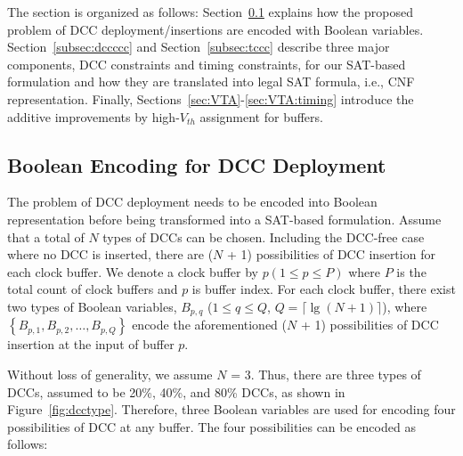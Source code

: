 The section is organized as follows: Section~\ref{subsec:eddcd} explains how the proposed problem of DCC deployment/insertions are encoded with Boolean variables. Section~\ref{subsec:dccccc} and Section~\ref{subsec:tccc} describe three major components, DCC constraints and timing constraints, for our SAT-based formulation and how they are translated into legal SAT formula, i.e., CNF representation. Finally, Sections~\ref{sec:VTA}-\ref{sec:VTA:timing} introduce the additive improvements by high-$V_{th}$ assignment for buffers.


\subsection{Boolean Encoding for DCC Deployment}
\label{subsec:eddcd}
The problem of DCC deployment needs to be encoded into Boolean representation before being transformed into a SAT-based formulation. Assume that a total of $N$ types of DCCs can be chosen. Including the DCC-free case where no DCC is inserted, there are ($N$ + 1) possibilities of DCC insertion for each clock buffer. We denote a clock buffer by $p\left(1 \leq p \leq P\right)$ where $P$ is the total count of clock buffers and $p$ is buffer index. For each clock buffer, there exist two types of Boolean variables, {\fontsize{9}{10}$B_{p,q}$} ($1 \leq q \leq Q $, $Q = \lceil \lg (N + 1)\rceil$), where {\fontsize{9}{10}$\left\{B_{p,1}, B_{p,2},\dotsc, B_{p,Q}\right\}$} encode the aforementioned ($N$ + 1) possibilities of DCC insertion at the input of buffer $p$.



Without loss of generality, we assume $N$ = 3. Thus, there are three types of DCCs, assumed to be 20\%, 40\%, and 80\% DCCs, as shown in Figure~\ref{fig:dcctype}. Therefore, three Boolean variables are used for encoding four possibilities of DCC at any buffer. The four possibilities can be encoded as follows:

